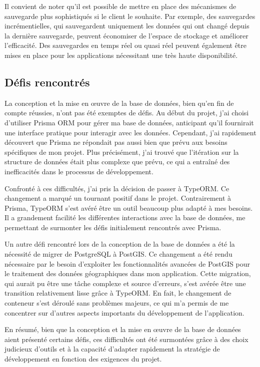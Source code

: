 Il convient de noter qu'il est possible de mettre en place des mécanismes de sauvegarde plus sophistiqués si le client le souhaite.
Par exemple, des sauvegardes incrémentielles, qui sauvegardent uniquement les données qui ont changé depuis la dernière sauvegarde, peuvent économiser de l'espace de stockage et améliorer l'efficacité.
Des sauvegardes en temps réel ou quasi réel peuvent également être mises en place pour les applications nécessitant une très haute disponibilité.

\subsection{Défis rencontrés}\label{subsec:challenges}
La conception et la mise en œuvre de la base de données, bien qu'en fin de compte réussies, n'ont pas été exemptes de défis.
Au début du projet, j'ai choisi d'utiliser Prisma ORM pour gérer ma base de données, anticipant qu'il fournirait une interface pratique pour interagir avec les données.
Cependant, j'ai rapidement découvert que Prisma ne répondait pas aussi bien que prévu aux besoins spécifiques de mon projet.
Plus précisément, j'ai trouvé que l'itération sur la structure de données était plus complexe que prévu, ce qui a entraîné des inefficacités dans le processus de développement.

Confronté à ces difficultés, j'ai pris la décision de passer à TypeORM. Ce changement a marqué un tournant positif dans le projet.
Contrairement à Prisma, TypeORM s'est avéré être un outil beaucoup plus adapté à mes besoins.
Il a grandement facilité les différentes interactions avec la base de données, me permettant de surmonter les défis initialement rencontrés avec Prisma.

Un autre défi rencontré lors de la conception de la base de données a été la nécessité de migrer de PostgreSQL à PostGIS.
Ce changement a été rendu nécessaire par le besoin d'exploiter les fonctionnalités avancées de PostGIS pour le traitement des données géographiques dans mon application.
Cette migration, qui aurait pu être une tâche complexe et source d'erreurs, s'est avérée être une transition relativement lisse grâce à TypeORM. En fait,
le changement de conteneur s'est déroulé sans problèmes majeurs, ce qui m'a permis de me concentrer sur d'autres aspects importants du développement de l'application.

En résumé, bien que la conception et la mise en œuvre de la base de données aient présenté certains défis,
ces difficultés ont été surmontées grâce à des choix judicieux d'outils et à la capacité d'adapter rapidement la stratégie
de développement en fonction des exigences du projet.